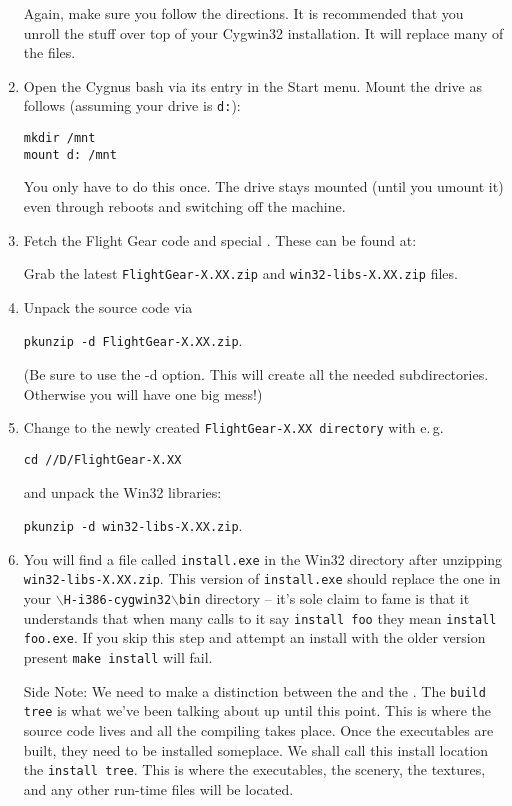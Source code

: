 \begin{enumerate}
 \noindent
    Again, make sure you follow the directions. It is recommended that you unroll the
     stuff over top of your Cygwin32 installation.  It will replace many of
    the files.

\item  Open the Cygnus bash via its entry in the Start menu.
    Mount the drive as follows (assuming your \FlightGear drive is \texttt{d:}):

         \texttt{mkdir /mnt}\\
         \texttt{mount d: /mnt}

 \noindent
    You only have to do this once. The drive stays mounted (until you
    umount it) even through reboots and switching off the machine.


\item  Fetch the Flight Gear code and special .  These
can  be found at:



 \noindent
    Grab the latest \texttt{FlightGear-X.XX.zip} and
    \texttt{win32-libs-X.XX.zip} files.

\item Unpack the \FlightGear source code via

        \texttt{pkunzip -d FlightGear-X.XX.zip}.

 \noindent
    (Be sure to use the -d option.  This will create all the needed
    subdirectories.  Otherwise you will have one big mess!)

\item  Change to the newly created \texttt{FlightGear-X.XX directory} with e.\,g.

\texttt{cd //D/FlightGear-X.XX}

 and unpack the Win32 libraries:

     \texttt{pkunzip -d win32-libs-X.XX.zip}.


\item  You will find a file called \texttt{install.exe} in the Win32
directory after unzipping \texttt{win32-libs-X.XX.zip}. This
version of \texttt{install.exe} should replace the one in your
$\backslash$\texttt{H-i386-cygwin32$\backslash$bin} directory --
it's sole claim to fame is that it understands that when many
calls to it say \texttt{install foo} they mean \texttt{install
foo.exe}. If you skip this step and attempt an install with the
older version present \texttt{make install} will fail.

Side Note: We need to make a distinction between the
\texttt{} and the \texttt{}.
The \texttt{build tree} is what we've been talking about up until
this point.  This is where the source code lives and all the
compiling takes place.  Once the executables are built, they need
to be installed someplace.  We shall call this install location
the \texttt{install tree}.  This is where the executables, the
scenery, the textures, and any other run-time files will be
located.


\end{enumerate}
